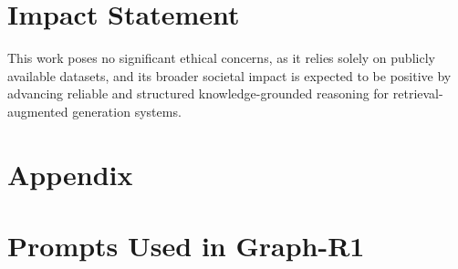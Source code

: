 \documentclass{article}
\theoremstyle{plain}
\theoremstyle{definition}
\theoremstyle{remark}
\begin{document}
\section*{Impact Statement}
This work poses no significant ethical concerns, as it relies solely on publicly available datasets, and its broader societal impact is expected to be positive by advancing reliable and structured knowledge-grounded reasoning for retrieval-augmented generation systems.
\nocite{langley00}




\newpage
\appendix
\onecolumn
\section*{Appendix} 
\section{Prompts Used in Graph-R1}
\end{document}
